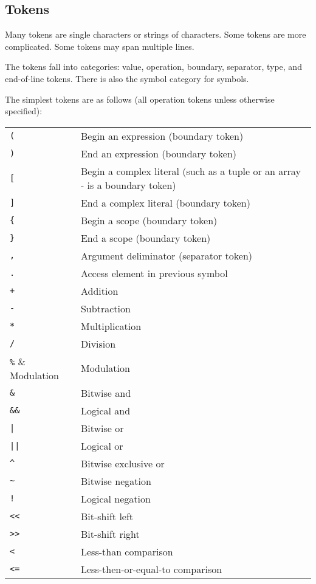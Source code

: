 \documentclass[10pt,a4paper]{article}
\begin{document}
\subsection{Tokens}
\label{sec:operations}
Many tokens are single characters or strings of characters. Some tokens are more complicated. Some tokens may span multiple lines.

The tokens fall into categories: value, operation, boundary, separator, type, and end-of-line tokens. There is also the symbol category for symbols. 

The simplest tokens are as follows (all operation tokens unless otherwise specified):

\begin{tabular}{l l}
\verb|(| & Begin an expression (boundary token) \\
\verb|)| & End an expression (boundary token) \\
\verb|[| & Begin a complex literal (such as a tuple or an array - is a boundary token) \\
\verb|]| & End a complex literal (boundary token) \\
\verb|{| & Begin a scope (boundary token) \\
\verb|}| & End a scope (boundary token) \\
\verb|,| & Argument deliminator (separator token) \\
\verb|.| & Access element in previous symbol \\
\verb|+| & Addition \\
\verb|-| & Subtraction \\
\verb|*| & Multiplication \\
\verb|/| & Division \\
\verb|%| & Modulation \\
\verb|&| & Bitwise and \\
\verb|&&| & Logical and \\
\verb/|/ & Bitwise or \\
\verb/||/ & Logical or \\
\verb|^| & Bitwise exclusive or \\
\verb|~| & Bitwise negation \\
\verb|!| & Logical negation \\
\verb|<<| & Bit-shift left \\
\verb|>>| & Bit-shift right \\
\verb|<| & Less-than comparison \\
\verb|<=| & Less-then-or-equal-to comparison \\

\end{tabular}
\end{document}
